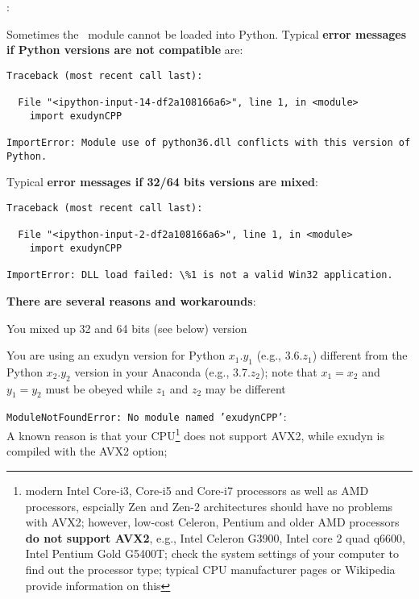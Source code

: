:
\bi
  \item Sometimes the \codeName\ module cannot be loaded into Python. Typical {\bf error messages if Python versions are not compatible} are: \vspace{1pt}\\
\plainlststyle
{\ttfamily \footnotesize
\begin{lstlisting}[breaklines=true]
Traceback (most recent call last):

  File "<ipython-input-14-df2a108166a6>", line 1, in <module>
    import exudynCPP

ImportError: Module use of python36.dll conflicts with this version of Python.
\end{lstlisting}
}%
Typical {\bf error messages if 32/64 bits versions are mixed}:\vspace{1pt}\\
{\ttfamily \footnotesize
\begin{lstlisting}[breaklines=true]
Traceback (most recent call last):

  File "<ipython-input-2-df2a108166a6>", line 1, in <module>
    import exudynCPP

ImportError: DLL load failed: \%1 is not a valid Win32 application.
\end{lstlisting}
}
%
	\item[] {\bf There are several reasons and workarounds}:
	  \item You mixed up 32 and 64 bits (see below) version
		\item You are using an exudyn version for Python $x_1.y_1$ (e.g., 3.6.$z_1$) different from the Python $x_2.y_2$ version in your Anaconda (e.g., 3.7.$z_2$); note that $x_1=x_2$ and $y_1=y_2$ must be obeyed while $z_1$ and $z_2$ may be different
		\item \texttt{ModuleNotFoundError: No module named 'exudynCPP'}:\\
		A known reason is that your CPU\footnote{modern Intel Core-i3, Core-i5 and Core-i7 processors as well as AMD processors, espcially Zen and Zen-2 architectures should have no problems with AVX2; however, low-cost Celeron, Pentium and older AMD processors {\bf do not support AVX2}, e.g.,  Intel Celeron G3900, Intel core 2 quad q6600, Intel Pentium Gold G5400T; check the system settings of your computer to find out the processor type; typical CPU manufacturer pages or Wikipedia provide information on this} does not support AVX2, while exudyn is compiled with the AVX2 option; \\
